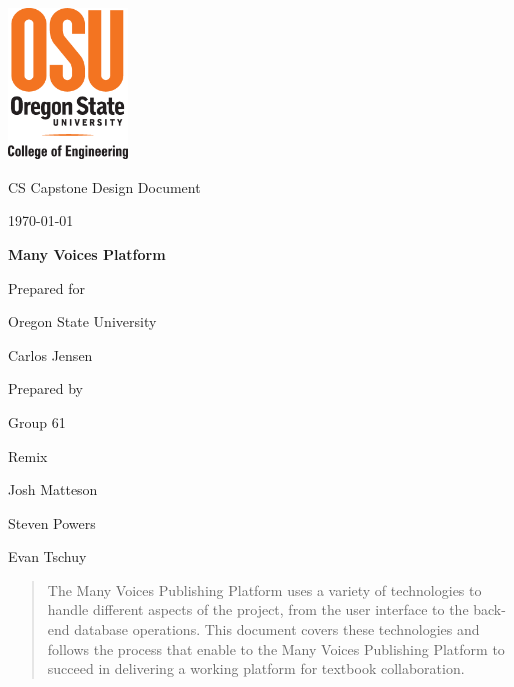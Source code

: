 \documentclass[onecolumn, draftclsnofoot,10pt, compsoc]{IEEEtran}
\def \CapstoneTeamName{		Remix}
\def \CapstoneTeamNumber{		61}
\def \GroupMemberOne{			Josh Matteson}
\def \GroupMemberTwo{			Steven Powers}
\def \GroupMemberThree{			Evan Tschuy}
\def \CapstoneProjectName{		Many Voices Platform}
\def \CapstoneSponsorCompany{	Oregon State University}
\def \CapstoneSponsorPerson{		Carlos Jensen}
\def \DocType{
				Design Document
				}
\newcommand{\NameSigPair}[1]{\par
\makebox[2.75in][r]{#1} \hfil 	\makebox[3.25in]{\makebox[2.25in]{\hrulefill} \hfill		\makebox[.75in]{\hrulefill}}
\par\vspace{-12pt} \textit{\tiny\noindent
\makebox[2.75in]{} \hfil		\makebox[3.25in]{\makebox[2.25in][r]{Signature} \hfill	\makebox[.75in][r]{Date}}}}
\renewcommand{\NameSigPair}[1]{#1}
\begin{document}
\begin{titlepage}
    \begin{singlespace}
    	\includegraphics[height=4cm]{coe_v_spot1}
        \hfill
        \par\vspace{.2in}
        \centering
        \scshape{
            \huge CS Capstone \DocType \par
            {\large\today}\par
            \vspace{.5in}
            \textbf{\Huge\CapstoneProjectName}\par
            \vfill
            {\large Prepared for}\par
            \Huge \CapstoneSponsorCompany\par
            \vspace{5pt}
            {\Large\NameSigPair{\CapstoneSponsorPerson}\par}
            {\large Prepared by }\par
            Group\CapstoneTeamNumber\par
            \CapstoneTeamName\par
            \vspace{5pt}
            {\Large
                \NameSigPair{\GroupMemberOne}\par
                \NameSigPair{\GroupMemberTwo}\par
                \NameSigPair{\GroupMemberThree}\par
            }
            \vspace{20pt}
        }
        \begin{abstract}
		\noindent The Many Voices Publishing Platform uses a variety of
		 technologies to handle different aspects of the project, from 
		 the user interface to the back-end database operations. 
		 This document covers these technologies and follows the process
		 that enable to the Many Voices Publishing Platform to succeed 
		 in delivering a working platform for textbook collaboration.
        \end{abstract}
    \end{singlespace}
\end{titlepage}
\newpage
{}
\tableofcontents
\clearpage
\end{document}
